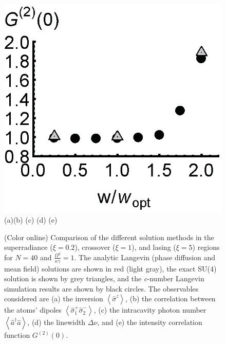 \documentclass[aps,
twocolumn,
showpacs,
superscriptaddress,groupedaddress]{revtex4}
\begin{document}
\begin{figure}
\begin{center}
	\hspace{-5.0mm} \includegraphics[scale =0.38] {N40LaserG2.eps}\\ \vspace{1mm}
	\hspace{5mm}(a)\hspace{30mm}(b) \hspace{30mm}(c) \hspace{30mm}(d) \hspace{30mm}(e)
\end{center}
		\vspace{-5mm}
\caption{(Color online) Comparison of the different solution methods in
the superradiance ($\xi=0.2$), crossover ($\xi=1$), and lasing ($\xi=5$)
regions for $N=40$ and $\frac{\Omega^2}{\kappa \gamma}=1$.  The analytic
Langevin (phase diffusion and mean field) solutions are shown in red
(light gray), the exact SU(4) solution is shown by grey triangles, and the {\it
c}-number Langevin simulation results are shown by black circles. The
observables considered are (a) the inversion
$\left<\hat{\sigma}^{z}\right>$, (b) the correlation between the atoms'
dipoles $\left<\hat{\sigma}_{1}^{+} \hat{\sigma}_{2}^{-}\right>$, (c)
the intracavity photon number  $\left<\hat{a}^{\dagger}\hat{a}\right>$,
(d) the linewidth $\Delta \nu$, and (e) the intensity correlation
function $G^{(2)}(0)$.}
\label{N40Comparison}
\end{figure}
\end{document}
